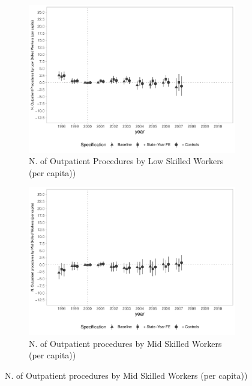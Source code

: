 \begin{figure}[h]
\begin{center}
    \begin{subfigure}{0.32\textwidth}
        \centering
        \caption{\scriptsize N. of Outpatient Procedures by Low Skilled Workers (per capita))}\label{fig:amb_e}
        \includegraphics[width=\textwidth]{plots/ambulatorial/sia_nprod_low_skill_mun_pcapita_dist_ec29_baseline_dist_ec29_baseline_full.pdf}
    \end{subfigure}
    \begin{subfigure}{0.32\textwidth}
        \centering
        \caption{\scriptsize N. of Outpatient procedures by Mid Skilled Workers (per capita))}\label{fig:amb_f}
        \includegraphics[width=\textwidth]{plots/ambulatorial/sia_nprod_med_skill_mun_pcapita_dist_ec29_baseline_dist_ec29_baseline_full.pdf}
    \end{subfigure}
    
    
    
    
    \end{center}
    
\end{figure}